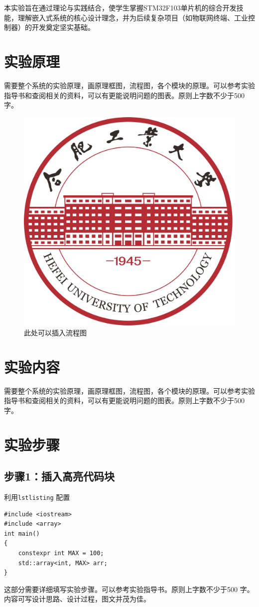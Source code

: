 \documentclass[12pt,hyperref,a4paper,twoside,UTF8]{ctexart}
\begin{document}
本实验旨在通过理论与实践结合，使学生掌握STM32F103单片机的综合开发技能，理解嵌入式系统的核心设计理念，并为后续复杂项目（如物联网终端、工业控制器）的开发奠定坚实基础。



\section{实验原理}

需要整个系统的实验原理，画原理框图，流程图，各个模块的原理。可以参考实验指导书和查阅相关的资料，可以有更能说明问题的图表。原则上字数不少于500字。

\begin{figure}[!htbp]
    \centering
    \includegraphics[width =.3\textwidth]{figures/hfutlogo.png}
    \caption{此处可以插入流程图}
    \label{Library}
\end{figure}


\section{实验内容}

需要整个系统的实验原理，画原理框图，流程图，各个模块的原理。可以参考实验指导书和查阅相关的资料，可以有更能说明问题的图表。原则上字数不少于500字。
\section{实验步骤}
\subsection{步骤1：插入高亮代码块}
利用\verb|lstlisting| 配置
\begin{lstlisting}[style=CPP, title="c++代码"]
#include <iostream>
#include <array>
int main()
{
    constexpr int MAX = 100;
    std::array<int, MAX> arr;
}  
\end{lstlisting}


这部分需要详细填写实验步骤。可以参考实验指导书。原则上字数不少于500
字。内容可写设计思路、设计过程，图文并茂为佳。
\end{document}
